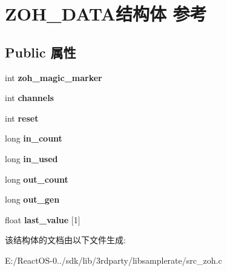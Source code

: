 \hypertarget{struct_z_o_h___d_a_t_a}{}\section{Z\+O\+H\+\_\+\+D\+A\+T\+A结构体 参考}
\label{struct_z_o_h___d_a_t_a}
\subsection*{Public 属性}
\begin{DoxyCompactItemize}
\item 
\mbox{\label{struct_z_o_h___d_a_t_a_adf97b1ed9f81c2aca26417b8b98c8e06}} 
int {\bfseries zoh\+\_\+magic\+\_\+marker}
\item 
\mbox{\label{struct_z_o_h___d_a_t_a_a67d7f4a10fdc17c744d78ead003c6c33}} 
int {\bfseries channels}
\item 
\mbox{\label{struct_z_o_h___d_a_t_a_a47e5cb1918d12c78e92b333c642e5ff7}} 
int {\bfseries reset}
\item 
\mbox{\label{struct_z_o_h___d_a_t_a_a0dd07961569aabdb3734c498466b8e4a}} 
long {\bfseries in\+\_\+count}
\item 
\mbox{\label{struct_z_o_h___d_a_t_a_a2b5dc723b201244b81f337a9e37951e6}} 
long {\bfseries in\+\_\+used}
\item 
\mbox{\label{struct_z_o_h___d_a_t_a_a252ed9af14916d13f735d5cadc2153e4}} 
long {\bfseries out\+\_\+count}
\item 
\mbox{\label{struct_z_o_h___d_a_t_a_a41679138a016b14cc870a27adcef92ac}} 
long {\bfseries out\+\_\+gen}
\item 
\mbox{\label{struct_z_o_h___d_a_t_a_ab633485bf1fbc322cdbb06fcb855e321}} 
float {\bfseries last\+\_\+value} \mbox{[}1\mbox{]}
\end{DoxyCompactItemize}


该结构体的文档由以下文件生成\+:\begin{DoxyCompactItemize}
\item 
E\+:/\+React\+O\+S-\/0../sdk/lib/3rdparty/libsamplerate/src\+\_\+zoh.\+c\end{DoxyCompactItemize}
